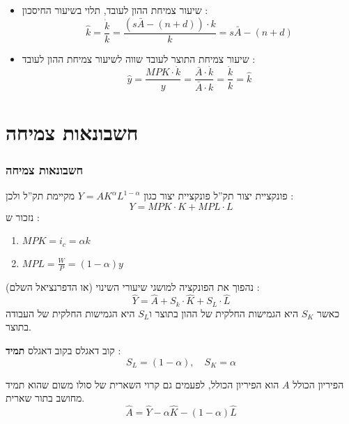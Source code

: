 \documentclass[usenames,dvipsnames,10pt]{beamer}
\begin{document}
\begin{RTL}
\begin{frame}[allowframebreaks]
\begin{itemize}
        \framebreak

        \item שיעור צמיחת ההון לעובד, תלוי בשיעור החיסכון : $$\widehat k = \frac{\dot k}{k} = \frac{\left(s \bar A - (n+d)\right) \cdot k}{k} = s \bar A - (n+d) $$
        \item שיעור צמיחת התוצר לעובד שווה לשיעור צמיחת ההון לעובד : $$\widehat y = \frac{MPK \cdot \dot k}{y} = \frac{\bar A \cdot \dot k }{\bar A \cdot k} = \frac{\dot k}{k} = \widehat k $$
        
    \end{itemize}


\end{frame}


\section{חשבונאות צמיחה}
\begin{frame}[allowframebreaks]
    \frametitle{חשבונאות צמיחה}
    \begin{block}{פונקציית יצור תק''ל}
        פונקציית יצור כגון $Y = A K^\alpha L^{1-\alpha}$ מקיימת תק''ל ולכן :
        $$Y = MPK \cdot K + MPL \cdot L$$
        נזכור ש : 
        \begin{enumerate}
            \item $MPK = i_c = \alpha k $
            \item $MPL = \frac{W}{P} =  (1-\alpha) y $
        \end{enumerate}

        נהפוך את הפונקציה למושגי שיעורי השינוי (או הדפרנציאל השלם) :
        $$\widehat Y = \widehat A + S_k \cdot \widehat K + S_L \cdot  \widehat L$$
        כאשר $S_K$ היא הגמישות החלקית של ההון בתוצר ו$S_L$ היא הגמישות החלקית של העבודה בתוצר.
    \end{block}

    \framebreak
    \begin{block}{קוב דאגלס}
        בקוב דאגלס \textbf{תמיד} :
        $$S_L = (1-\alpha), \quad S_K = \alpha$$
    \end{block}

    \begin{block}{הפיריון הכולל}
        $A$ הוא הפיריון הכולל, לפעמים גם קרוי השארית של סולו משום שהוא תמיד מחושב בתור שארית.
        $$
\widehat{A}=\widehat{Y}-\alpha \widehat{K}-(1-\alpha) \widehat{L}
$$
    \end{block}
    

\end{frame}


\end{RTL}
\end{document}
